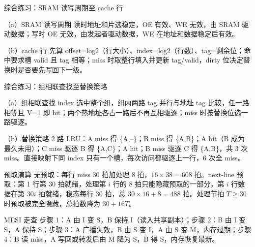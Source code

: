 \begin{chapteranswer}{综合练习：SRAM 读写周期至 cache 行}
\begin{answersubproblem}{（a）SRAM 读写周期}
读时地址和片选稳定，OE 有效、WE 无效，由 SRAM 驱动数据；写时 OE 无效，由发起者驱动数据，WE 在地址和数据稳定后有效。
\end{answersubproblem}
\begin{answersubproblem}{（b）cache 行}
先算 offset=log2（行大小）、index=log2（行数）、tag=剩余位；命中要求槽 valid 且 tag 相等；miss 时取整行填入并更新 tag/valid，dirty 位决定替换时是否要先写回下一级。
\end{answersubproblem}
\end{chapteranswer}

\begin{chapteranswer}{综合练习：组相联查找至替换策略}
\begin{answersubproblem}{（a）组相联查找}
index 选中整个组，组内两路 tag 并行与地址 tag 比较，任一路相等且 V=1 即 hit；两个热地址各占一路后不再互相驱逐；miss 时按替换位选一路驱逐。
\end{answersubproblem}
\begin{answersubproblem}{（b）替换策略}
2 路 LRU：A miss 得 \{A,--\}；B miss 得 \{A,B\}；A hit（B 成为最久未用）；C miss 驱逐 B 得 \{A,C\}；A hit；B miss 驱逐 C 得 \{A,B\}，共 3 次 miss。直接映射下同 index 只有一个槽，每次访问都驱逐上一行，6 次全 miss。
\end{answersubproblem}
\end{chapteranswer}

\begin{chapteranswer}{预取演算}
无预取：每行 miss 30 拍加处理 8 拍，$16\times38=608$ 拍。next-line 预取：第 1 行第 30 拍就绪，处理第 $i$ 行的 8 拍只能隐藏预取的一部分，第 $i$ 行数据在第 $30i$ 拍就绪，稳态每行 30 拍，总 $30\times16+8=488$ 拍。处理节拍 $T\geq30$ 时预取被完全隐藏，总拍数降为 $30+16T$。
\end{chapteranswer}

\begin{chapteranswer}{MESI 走查}
步骤 1：A 由 I 变 S，B 保持 I（读入共享副本）；步骤 2：B 由 I 变 S，A 保持 S；步骤 3：A 广播失效，B 由 S 变 I，A 由 S 变 M，内存过期；步骤 4：B 读 miss，A 写回或转发后由 M 降为 S，B 得 S，内存恢复最新。
\end{chapteranswer}
